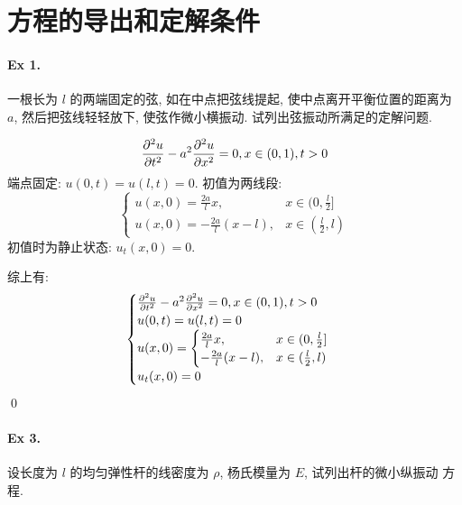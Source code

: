 \section{方程的导出和定解条件}
\paragraph{Ex 1.}
一根长为 $l$ 的两端固定的弦, 如在中点把弦线提起, 使中点离开平衡位置的距离为 $a$,
然后把弦线轻轻放下, 使弦作微小横振动. 试列出弦振动所满足的定解问题.

\begin{solution}
\[
{\frac{\partial {^2u}}{\partial {t^2}}} - a^2 {\frac{\partial {^2u}}{\partial {x^2}}} = 0,
x \in (0, 1), t > 0
\]
端点固定: $u(0, t) = u(l, t) = 0$. 初值为两线段:
\[\begin{cases}
    u(x, 0) = \frac{2a}{l} x, & x \in (0, \frac{l}{2}] \\
    u(x, 0) = -\frac{2a}{l} (x - l), & x \in (\frac{l}{2}, l)
\end{cases} \]
初值时为静止状态: $u_t(x, 0) = 0$.

综上有:
\[ \begin{cases}
{\frac{\partial {^2u}}{\partial {t^2}}} - a^2 {\frac{\partial {^2u}}{\partial {x^2}}} = 0,
x \in (0, 1), t > 0\\
u(0, t) = u(l, t) = 0\\
u(x, 0) = \begin{cases}
    \frac{2a}{l} x, & x \in (0, \frac{l}{2}] \\
    -\frac{2a}{l} (x - l), & x \in (\frac{l}{2}, l)
\end{cases}\\
u_t(x, 0) = 0
\end{cases} \]
\qed
\end{solution}
\paragraph{Ex 3.}
设长度为 $l$ 的均匀弹性杆的线密度为 $\rho$, 杨氏模量为 $E$, 试列出杆的微小纵振动
方程.

